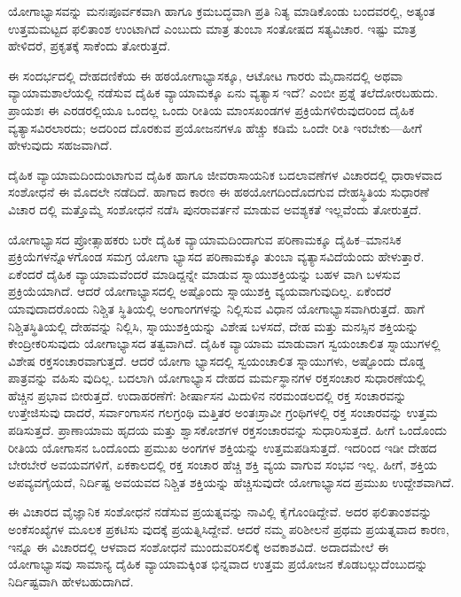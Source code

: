 ಯೋಗಾಭ್ಯಾಸವನ್ನು ಮನಃಪೂರ್ವಕವಾಗಿ ಹಾಗೂ ಕ್ರಮಬದ್ಧವಾಗಿ ಪ್ರತಿ ನಿತ್ಯ ಮಾಡಿಕೊಂಡು ಬಂದವರಲ್ಲಿ, ಅತ್ಯಂತ ಉತ್ತಮಮಟ್ಟದ ಫಲಿತಾಂಶ ಉಂಟಾಗಿದೆ ಎಂಬುದು ಮಾತ್ರ ತುಂಬಾ ಸಂತೋಷದ ಸತ್ಯವಿಚಾರ. ಇಷ್ಟು ಮಾತ್ರ ಹೇಳಿದರೆ, ಪ್ರಕೃತಕ್ಕೆ ಸಾಕೆಂದು ತೋರುತ್ತದೆ.

ಈ ಸಂದರ್ಭದಲ್ಲಿ ದೇಹದಣಿಕೆಯ ಈ ಹಠಯೋಗಾಭ್ಯಾಸಕ್ಕೂ, ಆಟೋಟ ಗಾರರು ಮೈದಾನದಲ್ಲಿ ಅಥವಾ ವ್ಯಾಯಾಮಶಾಲೆಯಲ್ಲಿ ನಡೆಸುವ ದೈಹಿಕ ವ್ಯಾಯಾಮಕ್ಕೂ ಏನು ವ್ಯತ್ಯಾಸ ಇದೆ? ಎಂಬೀ ಪ್ರಶ್ನೆ ತಲೆದೋರಬಹುದು. ಪ್ರಾಯಶಃ ಈ ಎರಡರಲ್ಲಿಯೂ ಒಂದಲ್ಲ ಒಂದು ರೀತಿಯ ಮಾಂಸಖಂಡಗಳ ಪ್ರಕ್ರಿಯೆಗಳಿರುವುದರಿಂದ ದೈಹಿಕ ವ್ಯತ್ಯಾಸವಿರಲಾರದು; ಅದರಿಂದ ದೊರಕುವ ಪ್ರಯೋಜನಗಳೂ ಹೆಚ್ಚು ಕಡಿಮೆ ಒಂದೇ ರೀತಿ ಇರಬೇಕು—ಹೀಗೆ ಹೇಳುವುದು ಸಹಜವಾಗಿದೆ.

ದೈಹಿಕ ವ್ಯಾಯಾಮದಿಂದುಂಟಾಗುವ ದೈಹಿಕ ಹಾಗೂ ಜೀವರಾಸಾಯನಿಕ ಬದಲಾವಣೆಗಳ ವಿಚಾರದಲ್ಲಿ ಧಾರಾಳವಾದ ಸಂಶೋಧನೆ ಈ ಮೊದಲೇ ನಡೆದಿದೆ. ಹಾಗಾದ ಕಾರಣ ಈ ಹಠಯೋಗದಿಂದೊದಗುವ ದೇಹಸ್ಥಿತಿಯ ಸುಧಾರಣೆ ವಿಚಾರ ದಲ್ಲಿ ಮತ್ತೊಮ್ಮೆ ಸಂಶೋಧನೆ ನಡೆಸಿ ಪುನರಾವರ್ತನೆ ಮಾಡುವ ಅವಶ್ಯಕತೆ ಇಲ್ಲವೆಂದು ತೋರುತ್ತದೆ.

ಯೋಗಾಭ್ಯಾಸದ ಪ್ರೋತ್ಸಾಹಕರು ಬರೇ ದೈಹಿಕ ವ್ಯಾಯಾಮದಿಂದಾಗುವ ಪರಿಣಾಮಕ್ಕೂ ದೈಹಿಕ–ಮಾನಸಿಕ ಪ್ರಕ್ರಿಯೆಗಳನ್ನೊಳಗೊಂಡ ಸಮಗ್ರ ಯೋಗಾ ಭ್ಯಾಸದ ಪರಿಣಾಮಕ್ಕೂ ತುಂಬಾ ವ್ಯತ್ಯಾಸವಿದೆಯೆಂದು ಹೇಳುತ್ತಾರೆ. ಏಕೆಂದರೆ ದೈಹಿಕ ವ್ಯಾಯಾಮವೆಂದರೆ ಮಾಡಿದ್ದನ್ನೇ ಮಾಡುವ ಸ್ನಾಯುಶಕ್ತಿಯನ್ನು ಬಹಳ ವಾಗಿ ಬಳಸುವ ಪ್ರಕ್ರಿಯೆಯಾಗಿದೆ. ಆದರೆ ಯೋಗಾಭ್ಯಾಸದಲ್ಲಿ ಅಷ್ಟೊಂದು ಸ್ನಾಯುಶಕ್ತಿ ವ್ಯಯವಾಗುವುದಿಲ್ಲ. ಏಕೆಂದರೆ ಯಾವುದಾದರೊಂದು ನಿಶ್ಚಿತ ಸ್ಥಿತಿಯಲ್ಲಿ ಅಂಗಾಂಗಗಳನ್ನು ನಿಲ್ಲಿಸುವ ವಿಧಾನ ಯೋಗಾಭ್ಯಾಸವಾಗಿರುತ್ತದೆ. ಹಾಗೆ ನಿಶ್ಚಿತಸ್ಥಿತಿಯಲ್ಲಿ ದೇಹವನ್ನು ನಿಲ್ಲಿಸಿ, ಸ್ನಾಯುಶಕ್ತಿಯನ್ನು ವಿಶೇಷ ಬಳಸದೆ, ದೇಹ ಮತ್ತು ಮನಸ್ಸಿನ ಶಕ್ತಿಯನ್ನು ಕೇಂದ್ರೀಕರಿಸುವುದು ಯೋಗಾಭ್ಯಾಸದ ತತ್ವವಾಗಿದೆ. ದೈಹಿಕ ವ್ಯಾಯಾಮ ಮಾಡುವಾಗ ಸ್ವಯಂಚಾಲಿತ ಸ್ನಾಯುಗಳಲ್ಲಿ  ವಿಶೇಷ ರಕ್ತಸಂಚಾರವಾಗುತ್ತದೆ. ಆದರೆ ಯೋಗಾ ಭ್ಯಾಸದಲ್ಲಿ ಸ್ವಯಂಚಾಲಿತ ಸ್ನಾಯುಗಳು, ಅಷ್ಟೊಂದು ದೊಡ್ಡ ಪಾತ್ರವನ್ನು ವಹಿಸು ವುದಿಲ್ಲ. ಬದಲಾಗಿ ಯೋಗಾಭ್ಯಾಸ ದೇಹದ ಮರ್ಮಸ್ಥಾನಗಳ  ರಕ್ತಸಂಚಾರ ಸುಧಾರಣೆಯಲ್ಲಿ ಹೆಚ್ಚಿನ ಪ್ರಭಾವ ಬೀರುತ್ತದೆ. ಉದಾಹರಣೆಗೆ: ಶೀರ್ಷಾಸನ ಮಿದುಳಿನ ನರಮಂಡಲದಲ್ಲಿ ರಕ್ತ ಸಂಚಾರವನ್ನು ಉತ್ತೇಜಿಸುವು ದಾದರೆ, ಸರ್ವಾಂಗಾಸನ ಗಲಗ್ರಂಥಿ ಮತ್ತಿತರ ಅಂತಃಸ್ರಾವೀ ಗ್ರಂಥಿಗಳಲ್ಲಿ  ರಕ್ತ ಸಂಚಾರವನ್ನು ಉತ್ತಮ ಪಡಿಸುತ್ತದೆ. ಪ್ರಾಣಾಯಾಮ ಹೃದಯ ಮತ್ತು ಶ್ವಾಸಕೋಶಗಳ ರಕ್ತಸಂಚಾರವನ್ನು ಸುಧಾರಿಸುತ್ತದೆ. ಹೀಗೆ ಒಂದೊಂದು ರೀತಿಯ ಯೋಗಾಸನ ಒಂದೊಂದು ಪ್ರಮುಖ ಅಂಗಗಳ ಶಕ್ತಿಯನ್ನು ಉತ್ತಮಪಡಿಸುತ್ತದೆ. ಇದರಿಂದ ಇಡೀ ದೇಹದ ಬೇರಬೇರೆ ಅವಯವಗಳಿಗೆ, ಏಕಕಾಲದಲ್ಲಿ ರಕ್ತ ಸಂಚಾರ ಹೆಚ್ಚಿ ಶಕ್ತಿ ವ್ಯಯ ವಾಗುವ ಸಂಭವ ಇಲ್ಲ. ಹೀಗೆ, ಶಕ್ತಿಯ ಅಪವ್ಯವಗೈಯದೆ, ನಿರ್ದಿಷ್ಟ ಅವಯವದ ನಿಶ್ಚಿತ ಶಕ್ತಿಯನ್ನು ಹೆಚ್ಚಿಸುವುದೇ ಯೋಗಾಭ್ಯಾಸದ ಪ್ರಮುಖ ಉದ್ದೇಶವಾಗಿದೆ.

ಈ ವಿಚಾರದ ವೈಜ್ಞಾನಿಕ ಸಂಶೋಧನೆ ನಡೆಸುವ ಪ್ರಯತ್ನವನ್ನು ನಾವಿಲ್ಲಿ ಕೈಗೊಂಡಿದ್ದೇವೆ. ಅದರ ಫಲಿತಾಂಶವನ್ನು ಅಂಕೆಸಂಖ್ಯೆಗಳ ಮೂಲಕ ಪ್ರಕಟಿಸು ವುದಕ್ಕೆ ಪ್ರಯತ್ನಿಸಿದ್ದೇವೆ. ಆದರೆ ನಮ್ಮ ಪರಿಶೀಲನೆ ಪ್ರಥಮ ಪ್ರಯತ್ನವಾದ ಕಾರಣ, ಇನ್ನೂ ಈ ವಿಚಾರದಲ್ಲಿ ಆಳವಾದ ಸಂಶೋಧನೆ ಮುಂದುವರಿಸಲಿಕ್ಕೆ ಅವಕಾಶವಿದೆ. ಅದಾದಮೇಲೆ ಈ ಯೋಗಾಭ್ಯಾಸವು ಸಾಮಾನ್ಯ ದೈಹಿಕ ವ್ಯಾಯಾಮಕ್ಕಿಂತ ಭಿನ್ನವಾದ ಉತ್ತಮ ಪ್ರಯೋಜನ ಕೊಡಬಲ್ಲುದೆಂಬುದನ್ನು ನಿರ್ದಿಷ್ಟವಾಗಿ ಹೇಳಬಹುದಾಗಿದೆ.

\delimiter

